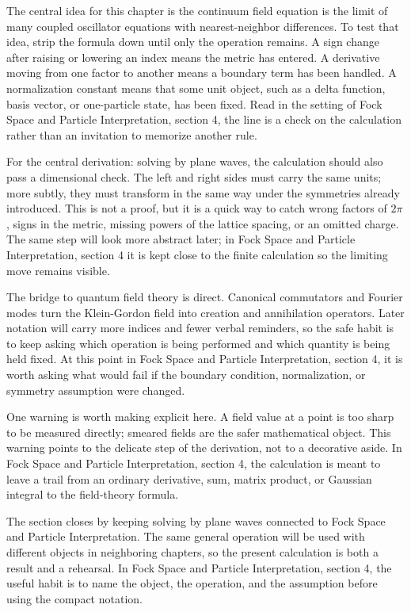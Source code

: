 The central idea for this chapter is the continuum field equation is the limit of many coupled oscillator equations with nearest-neighbor differences.  To test that idea, strip the formula down until only the operation remains.  A sign change after raising or lowering an index means the metric has entered.  A derivative moving from one factor to another means a boundary term has been handled.  A normalization constant means that some unit object, such as a delta function, basis vector, or one-particle state, has been fixed.  Read in the setting of Fock Space and Particle Interpretation, section 4, the line is a check on the calculation rather than an invitation to memorize another rule.

For the central derivation: solving by plane waves, the calculation should also pass a dimensional check.  The left and right sides must carry the same units; more subtly, they must transform in the same way under the symmetries already introduced.  This is not a proof, but it is a quick way to catch wrong factors of \(2\pi\), signs in the metric, missing powers of the lattice spacing, or an omitted charge.  The same step will look more abstract later; in Fock Space and Particle Interpretation, section 4 it is kept close to the finite calculation so the limiting move remains visible.

The bridge to quantum field theory is direct.  Canonical commutators and Fourier modes turn the Klein-Gordon field into creation and annihilation operators.  Later notation will carry more indices and fewer verbal reminders, so the safe habit is to keep asking which operation is being performed and which quantity is being held fixed.  At this point in Fock Space and Particle Interpretation, section 4, it is worth asking what would fail if the boundary condition, normalization, or symmetry assumption were changed.

One warning is worth making explicit here.  A field value at a point is too sharp to be measured directly; smeared fields are the safer mathematical object.  This warning points to the delicate step of the derivation, not to a decorative aside.  In Fock Space and Particle Interpretation, section 4, the calculation is meant to leave a trail from an ordinary derivative, sum, matrix product, or Gaussian integral to the field-theory formula.

The section closes by keeping solving by plane waves connected to Fock Space and Particle Interpretation.  The same general operation will be used with different objects in neighboring chapters, so the present calculation is both a result and a rehearsal.  In Fock Space and Particle Interpretation, section 4, the useful habit is to name the object, the operation, and the assumption before using the compact notation.



